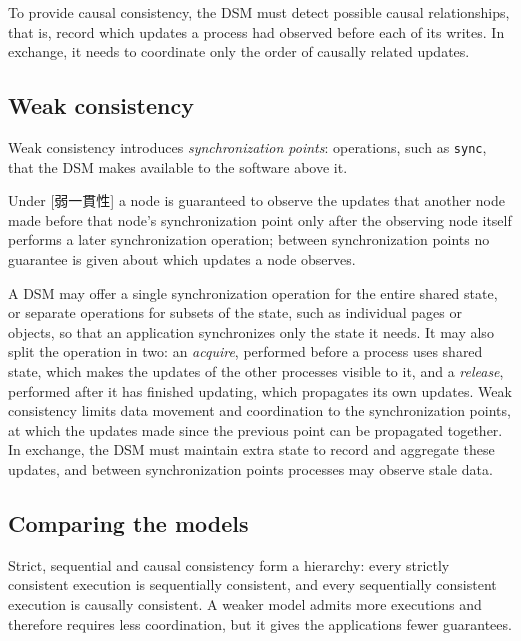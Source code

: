 \documentclass[../main.tex]{subfiles}
\begin{document}
To provide causal consistency, the DSM must detect possible causal
relationships, that is, record which updates a process had observed before
each of its writes.  In exchange, it needs
to coordinate only the order of causally related updates.

\subsection{Weak consistency}

Weak consistency introduces \emph{synchronization points}: operations, such
as \texttt{sync}, that the DSM makes available to the software above it.

\begin{definition}
  Under [弱一貫性] a node is guaranteed to observe
  the updates that another node made before that node's synchronization
  point only after the observing node itself performs a later
  synchronization operation; between synchronization points no guarantee is
  given about which updates a node observes.
\end{definition}

A DSM may offer a single synchronization operation for the entire shared
state, or separate operations for subsets of the state, such as individual
pages or objects, so that an application synchronizes only the state it
needs.  It may also split the operation in two: an \emph{acquire},
performed before a process uses shared state, which makes the updates of
the other processes visible to it, and a \emph{release}, performed after it
has finished updating, which propagates its own updates.  Weak
consistency limits data movement and coordination to the synchronization
points, at which the updates made since the previous point can be
propagated together.  In exchange, the DSM must maintain extra state
to record and aggregate these updates, and between synchronization points
processes may observe stale data.

\subsection{Comparing the models}

Strict, sequential and causal consistency form a hierarchy: every strictly
consistent execution is sequentially consistent, and every sequentially
consistent execution is causally consistent.  A weaker model admits more
executions and therefore requires less coordination, but it gives the
applications fewer guarantees.
\end{document}
